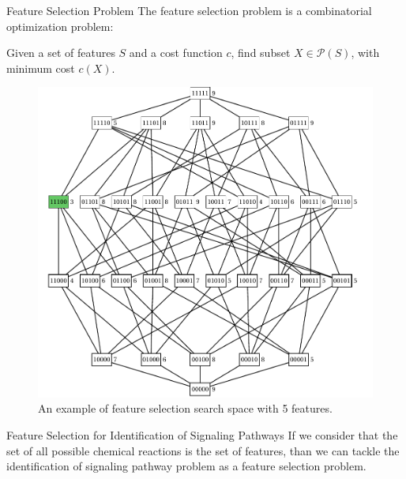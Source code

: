 \documentclass{beamer}
\newcommand{\powerset}{\mathcal{P}}
\begin{document}
\begin{frame}{Feature Selection Problem}
The feature selection problem is a combinatorial optimization problem:
\begin{center}
Given a set of features $S$ and a cost function $c$, find subset 
        $X \in \powerset (S)$, with minimum cost $c(X)$.
\end{center}

\pause
\begin{figure}
    \includegraphics[scale=.24]{introduction/Boolean_lattice.pdf}
    \caption{An example of feature selection search space with 5 
    features.}
\end{figure}
\end{frame}


\begin{frame}{Feature Selection for Identification of Signaling Pathways}
If we consider that the set of all possible chemical reactions is the
set of features, than we can tackle the identification of signaling 
pathway problem as a feature selection problem.
\end{frame}

\end{document}
